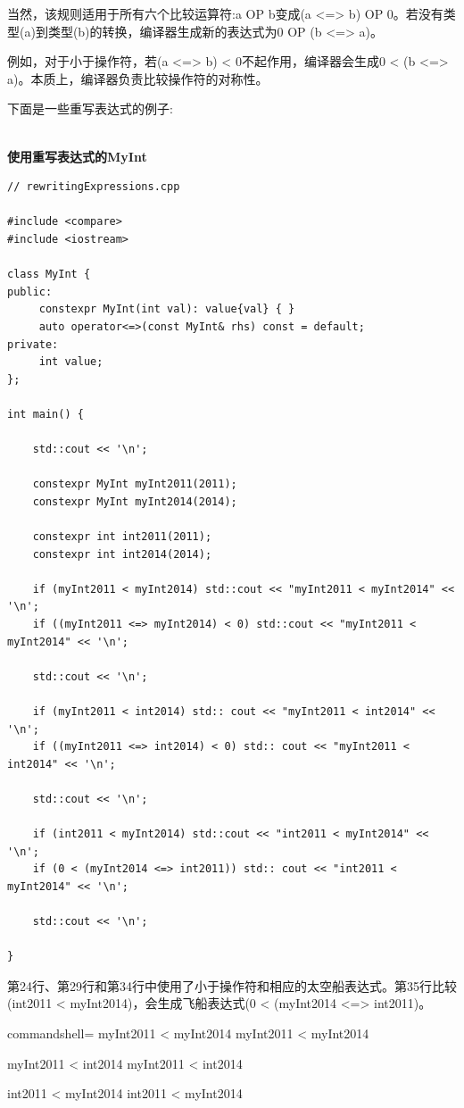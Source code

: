 当然，该规则适用于所有六个比较运算符:a OP b变成(a <=> b) OP 0。若没有类型(a)到类型(b)的转换，编译器生成新的表达式为0 OP (b <=> a)。

例如，对于小于操作符，若(a <=> b) < 0不起作用，编译器会生成0 < (b <=> a)。本质上，编译器负责比较操作符的对称性。

下面是一些重写表达式的例子:

\hspace*{\fill} \\ %
\noindent
\textbf{使用重写表达式的MyInt}
\begin{lstlisting}[style=styleCXX]
// rewritingExpressions.cpp

#include <compare>
#include <iostream>

class MyInt {
public:
	 constexpr MyInt(int val): value{val} { }
	 auto operator<=>(const MyInt& rhs) const = default;
private:
	 int value;
};

int main() {
	
	std::cout << '\n';
	
	constexpr MyInt myInt2011(2011);
	constexpr MyInt myInt2014(2014);
	
	constexpr int int2011(2011);
	constexpr int int2014(2014);
	
	if (myInt2011 < myInt2014) std::cout << "myInt2011 < myInt2014" << '\n';
	if ((myInt2011 <=> myInt2014) < 0) std::cout << "myInt2011 < myInt2014" << '\n';
	
	std::cout << '\n';
	
	if (myInt2011 < int2014) std:: cout << "myInt2011 < int2014" << '\n';
	if ((myInt2011 <=> int2014) < 0) std:: cout << "myInt2011 < int2014" << '\n';
	
	std::cout << '\n';
	
	if (int2011 < myInt2014) std::cout << "int2011 < myInt2014" << '\n';
	if (0 < (myInt2014 <=> int2011)) std:: cout << "int2011 < myInt2014" << '\n';
	
	std::cout << '\n';

}
\end{lstlisting}

第24行、第29行和第34行中使用了小于操作符和相应的太空船表达式。第35行比较(int2011 < myInt2014)，会生成飞船表达式(0 < (myInt2014 <=> int2011)。

\begin{tcblisting}{commandshell={}}
myInt2011 < myInt2014
myInt2011 < myInt2014

myInt2011 < int2014
myInt2011 < int2014

int2011 < myInt2014
int2011 < myInt2014
\end{tcblisting}

